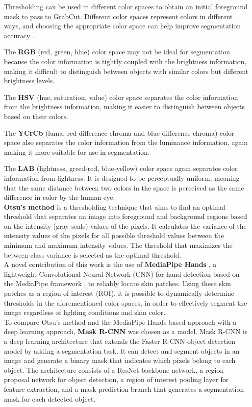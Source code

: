 \documentclass[conference]{IEEEtran}
\begin{document}
Thresholding can be used in different color spaces to obtain an initial foreground mask to pass to GrabCut. Different color spaces represent colors in different ways, and choosing the appropriate color space can help improve segmentation accuracy \cite{b5}.

The \textbf{RGB} (red, green, blue) color space may not be ideal for segmentation because the color information is tightly coupled with the brightness information, making it difficult to distinguish between objects with similar colors but different brightness levels.

The \textbf{HSV} (hue, saturation, value) color space separates the color information from the brightness information, making it easier to distinguish between objects based on their colors.

The \textbf{YCrCb} (luma, red-difference chroma and blue-difference chroma) color space also separates the color information from the luminance information, again making it more suitable for use in segmentation.

The \textbf{LAB} (lightness, greed-red, blue-yellow) color space again separates color information from lightness. It is designed to be perceptually uniform, meaning that the same distance between two colors in the space is perceived as the same difference in color by the human eye. \\

\textbf{Otsu's method} \cite{b6} is a thresholding technique that aims to find an optimal threshold that separates an image into foreground and background regions based on the intensity (gray scale) values of the pixels. It calculates the variance of the intensity values of the pixels for all possible threshold values between the minimum and maximum intensity values. The threshold that maximizes the between-class variance is selected as the optimal threshold. \\

A novel contribution of this work is the use of \textbf{MediaPipe Hands} \cite{b7}, a lightweight Convolutional Neural Network (CNN) for hand detection based on the MediaPipe framework \cite{b8}, to reliably locate skin patches. Using these skin patches as a region of interest (ROI), it is possible to dynamically determine thresholds in the aforementioned color spaces, in order to effectively segment the image regardless of lighting conditions and skin color. \\

To compare Otsu's method and the MediaPipe Hands-based approach with a deep learning approach, \textbf{Mask R-CNN} \cite{b9} was chosen as a model. Mask R-CNN is a deep learning architecture that extends the Faster R-CNN \cite{b10} object detection model by adding a segmentation task. It can detect and segment objects in an image and generate a binary mask that indicates which pixels belong to each object. The architecture consists of a ResNet \cite{b11} backbone network, a region proposal network for object detection, a region of interest pooling layer for feature extraction, and a mask prediction branch that generates a segmentation mask for each detected object.
\end{document}
